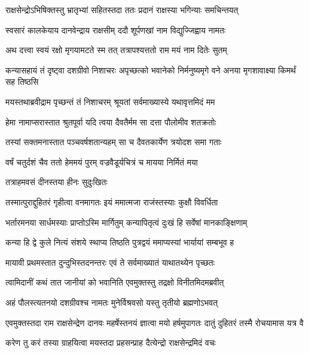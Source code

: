 
\twolineshloka
{राक्षसेन्द्रोऽभिषिक्तस्तु भ्रातृभ्यां सहितस्तदा}
{ततः प्रदानं राक्षस्या भगिन्याः समचिन्तयत्} %

\twolineshloka
{स्वसारं कालकेयाय दानवेन्द्राय राक्षसीम्}
{ददौ शूर्पणखां नाम विद्युज्जिह्वाय नामतः} %

\twolineshloka
{अथ दत्त्वा स्वयं रक्षो मृगयामटते स्म तत्}
{तत्रापश्यत्ततो राम मयं नाम दितेः सुतम्} %

\threelineshloka
{कन्यासहायं तं दृष्ट्वा दशग्रीवो निशाचरः}
{अपृच्छत्को भवानेको निर्मनुष्यमृगे वने}
{अनया मृगशावाक्ष्या किमर्थं सह तिष्ठसि} %

\twolineshloka
{मयस्तथाब्रवीद्राम पृच्छन्तं तं निशाचरम्}
{श्रूयतां सर्वमाख्यास्ये यथावृत्तमिदं मम} %

\twolineshloka
{हेमा नामाप्सरास्तात श्रुतपूर्वा यदि त्वया}
{दैवतैर्मम सा दत्ता पौलोमीव शतक्रतोः} %

\twolineshloka
{तस्यां सक्तमनास्तात पञ्चवर्षशतान्यहम्}
{सा च दैवतकार्येण त्रयोदश समा गताः} %

\twolineshloka
{वर्षं चतुर्दशं चैव ततो हेममयं पुरम्}
{वज्रवैडूर्यचित्रं च मायया निर्मितं मया} %

\onelineshloka
{तत्राहमवसं दीनस्तया हीनः सुदुःखितः} %

\twolineshloka
{तस्मात्पुराद्दुहितरं गृहीत्वा वनमागतः}
{इयं ममात्मजा राजंस्तस्याः कुक्षौ विवर्धिता} %

\twolineshloka
{भर्तारमनया सार्धमस्याः प्राप्तोऽस्मि मार्गितुम्}
{कन्यापितृत्वं दुःखं हि सर्वेषां मानकाङ्क्षिणाम्} %

\twolineshloka
{कन्या हि द्वे कुले नित्यं संशये स्थाप्य तिष्ठति}
{पुत्रद्वयं ममाप्यस्यां भार्यायां सम्बभूव ह} %

\twolineshloka
{मायावी प्रथमस्तात दुन्दुभिस्तदनन्तरः}
{एवं ते सर्वमाख्यातं याथातथ्येन पृच्छतः} %

\twolineshloka
{त्वामिदानीं कथं तात जानीयां को भवानिति}
{एवमुक्तस्तु तद्रक्षो विनीतमिदमब्रवीत्} %

\twolineshloka
{अहं पौलस्त्यतनयो दशग्रीवश्च नामतः}
{मुनेर्विश्रवसो यस्तु तृतीयो ब्रह्मणोऽभवत्} %

\threelineshloka
{एवमुक्तस्तदा राम राक्षसेन्द्रेण दानवः}
{महर्षेस्तनयं ज्ञात्वा मयो हर्षमुपागतः}
{दातुं दुहितरं तस्मै रोचयामास यत्र वै} %

\twolineshloka
{करेण तु करं तस्या ग्राहयित्वा मयस्तदा}
{प्रहसन्प्राह दैत्येन्द्रो राक्षसेन्द्रमिदं वचः} %

